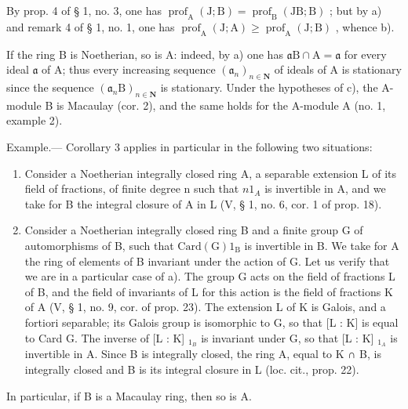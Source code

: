 By prop. 4 of § 1, no. 3, one has \(\operatorname{prof}_{\mathrm{A}}(\mathrm{J};\mathrm{B}) = \operatorname{prof}_{\mathrm{B}}(\mathrm{JB};\mathrm{B})\) ; but by a) and remark 4 of § 1, no. 1, one has \(\operatorname{prof}_{\mathrm{A}}(\mathrm{J};\mathrm{A}) \geqslant \operatorname{prof}_{\mathrm{A}}(\mathrm{J};\mathrm{B})\) , whence b).

If the ring B is Noetherian, so is A: indeed, by a) one has \(\mathfrak{a}\mathrm{B} \cap \mathrm{A} = \mathfrak{a}\) for every ideal \(\mathfrak{a}\) of A; thus every increasing sequence \((\mathfrak{a}_n)_{n \in \mathbf{N}}\) of ideals of A is stationary since the sequence \((\mathfrak{a}_n\mathrm{B})_{n \in \mathbf{N}}\) is stationary. Under the hypotheses of c), the A-module B is Macaulay (cor. 2), and the same holds for the A-module A (no. 1, example 2).

Example.--- Corollary 3 applies in particular in the following two situations:

\begin{enumerate}
\def\labelenumi{\alph{enumi})}
\item
  Consider a Noetherian integrally closed ring A, a separable extension L of its field of fractions, of finite degree n such that \(n1_{A}\) is invertible in A, and we take for B the integral closure of A in L (V, § 1, no. 6, cor. 1 of prop. 18).
\item
  Consider a Noetherian integrally closed ring B and a finite group G of automorphisms of B, such that \(\mathrm{Card(G)1_B}\) is invertible in B. We take for A the ring of elements of B invariant under the action of G. Let us verify that we are in a particular case of a). The group G acts on the field of fractions L of B, and the field of invariants of L for this action is the field of fractions K of A (V, § 1, no. 9, cor. of prop. 23). The extension L of K is Galois, and a fortiori separable; its Galois group is isomorphic to G, so that {[}L : K{]} is equal to Card G. The inverse of {[}L : K{]} \(_{1_{B}}\) is invariant under G, so that {[}L : K{]} \(_{1_{A}}\) is invertible in A. Since B is integrally closed, the ring A, equal to K ∩ B, is integrally closed and B is its integral closure in L (loc. cit., prop. 22).
\end{enumerate}

In particular, if B is a Macaulay ring, then so is A.

